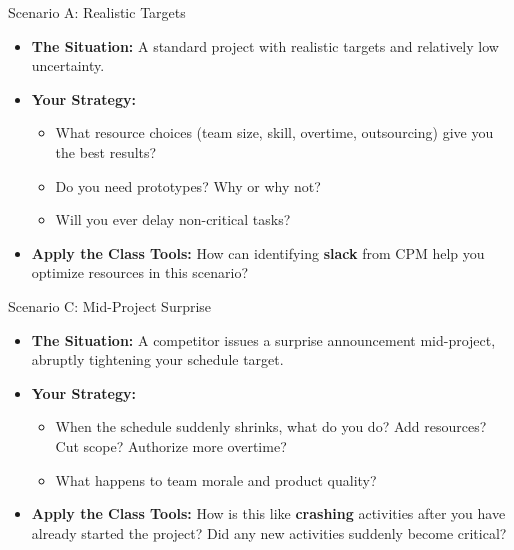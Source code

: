 \documentclass[11pt,aspectratio=169]{beamer}
\begin{document}
\begin{frame}{Scenario A: Realistic Targets}
    \begin{itemize}[<+->]
        \item \textbf{The Situation:} A standard project with realistic targets and relatively low uncertainty.
        \item \textbf{Your Strategy:} 
        \begin{itemize}
            \item What resource choices (team size, skill, overtime, outsourcing) give you the best results?
            \item Do you need prototypes? Why or why not?
            \item Will you ever delay non-critical tasks?
        \end{itemize}
        \vspace{1em}
        \item \textbf{Apply the Class Tools:} How can identifying \textbf{slack} from CPM help you optimize resources in this scenario?
    \end{itemize}
\end{frame}

\begin{frame}{Scenario C: Mid-Project Surprise}
    \begin{itemize}[<+->]
        \item \textbf{The Situation:} A competitor issues a surprise announcement mid-project, abruptly tightening your schedule target.
        \item \textbf{Your Strategy:}
        \begin{itemize}
            \item When the schedule suddenly shrinks, what do you do? Add resources? Cut scope? Authorize more overtime?
            \item What happens to team morale and product quality?
        \end{itemize}
        \vspace{1em}
        \item \textbf{Apply the Class Tools:} How is this like \textbf{crashing} activities after you have already started the project? Did any new activities suddenly become critical?
    \end{itemize}
\end{frame}
\end{document}
